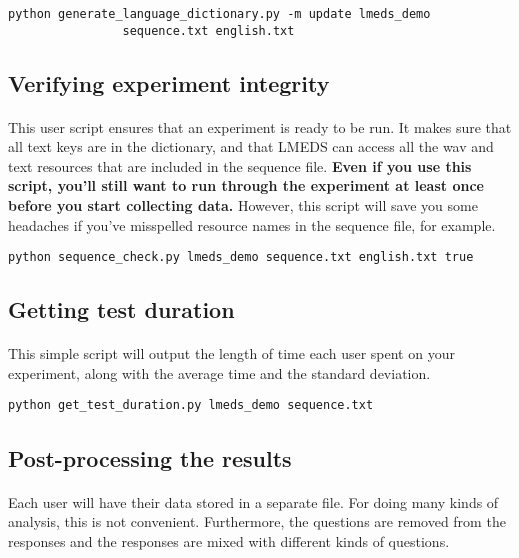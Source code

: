 \begin{lstlisting}
python generate_language_dictionary.py -m update lmeds_demo 
				sequence.txt english.txt
\end{lstlisting}

\subsection{Verifying experiment integrity}

\paragraph{}
This user script ensures that an experiment is ready to be run.  It makes sure that all text keys are in the dictionary, and that LMEDS can access all the wav and text resources that are included in the sequence file.  \textbf{Even if you use this script, you'll still want to run through the experiment at least once before you start collecting data.}  However, this script will save you some headaches if you've misspelled resource names in the sequence file, for example.

\begin{lstlisting}
python sequence_check.py lmeds_demo sequence.txt english.txt true
\end{lstlisting}

\subsection{Getting test duration}

\paragraph{}
This simple script will output the length of time each user spent on your experiment, along with the average time and the standard deviation.

\begin{lstlisting}
python get_test_duration.py lmeds_demo sequence.txt
\end{lstlisting}

\subsection{Post-processing the results}

\paragraph{}
Each user will have their data stored in a separate file.  For doing many kinds of analysis, this is not convenient.  Furthermore, the questions are removed from the responses and the responses are mixed with different kinds of questions.

